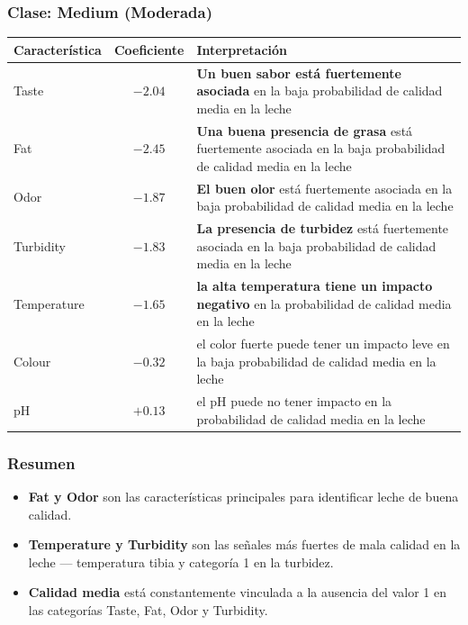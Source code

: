 \documentclass[12pt,a4paper]{article}
\begin{document}
\begin{itemize}
							\subsubsection*{Clase: Medium (Moderada)}
							\begin{center}
							\begin{tabular}{lcp{8cm}}
							\hline
							\textbf{Característica} & \textbf{Coeficiente} & \textbf{Interpretación} \\
							\hline
							Taste       & $\mathbf{-2.04}$ & \textbf{Un buen sabor está fuertemente asociada} en la baja probabilidad de calidad media en la leche \\
							Fat         & $\mathbf{-2.45}$ & \textbf{Una buena presencia de grasa} está fuertemente asociada en la baja probabilidad de calidad media en la leche \\
							Odor        & $\mathbf{-1.87}$ & \textbf{El buen olor} está fuertemente asociada en la baja probabilidad de calidad media en la leche \\
							Turbidity   & $\mathbf{-1.83}$ & \textbf{La presencia de turbidez} está fuertemente asociada en la baja probabilidad de calidad media en la leche \\
							Temperature & $-1.65$ & \textbf{la alta temperatura tiene un impacto negativo} en la probabilidad de calidad media en la leche \\
							Colour      & $-0.32$ & el color fuerte puede tener un impacto leve en la baja probabilidad de calidad media en la leche \\
							pH          & $+0.13$ & el pH puede no tener impacto en la probabilidad de calidad media en la leche \\
							\hline
							\end{tabular}
							\end{center}
							
							\subsubsection*{Resumen}
							\begin{itemize}
							    \item[$\scalebox{0.7}{$\blacksquare$}$] \textbf{Fat y Odor} son las características principales para identificar leche de buena calidad.
							    \item[$\scalebox{0.7}{$\blacksquare$}$] \textbf{Temperature y Turbidity} son las señales más fuertes de mala calidad en la leche — temperatura tibia y categoría 1 en la turbidez.
							    \item[$\scalebox{0.7}{$\blacksquare$}$] \textbf{Calidad media} está constantemente vinculada a la ausencia del valor 1 en las categorías Taste, Fat, Odor y Turbidity.
							\end{itemize}


\end{itemize}
\end{document}
